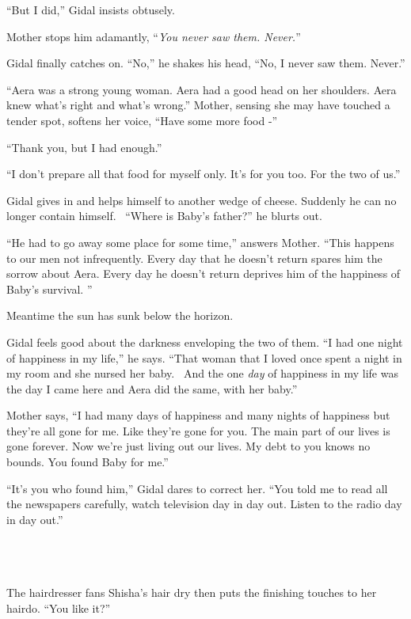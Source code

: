 \documentclass[twoside,11pt]{book}
\begin{document}
``But I did,'' Gidal insists obtusely.

Mother stops him adamantly, ``\textit{You never saw them. Never.}''

Gidal finally catches on. ``No,'' he shakes his head, ``No, I never saw them. Never.''

``Aera was a strong young woman. Aera had a good head on her shoulders. Aera knew what's right and what's
wrong.'' Mother, sensing she may have touched a tender spot, softens her voice, ``Have some
more food -''

``Thank you, but I had enough.''

``I don't prepare all that food for myself only. It's for you too. For the two of us.''

Gidal gives in and helps himself to another wedge of cheese. Suddenly he can no longer contain himself.
\ ``Where is Baby's father?'' he blurts out.

``He had to go away some place for some time,'' answers Mother. ``This happens to
our men not infrequently. Every day that he doesn't return spares him the sorrow about Aera. Every day he doesn't
return deprives him of the happiness of Baby's survival. ''

Meantime the sun has sunk below the horizon.

Gidal feels good about the darkness enveloping the two of them. ``I had one night of happiness in my
life,'' he says. ``That woman that I loved once spent a night in my room and she nursed her
baby. \ And the{ }one \textit{day }of happiness in my life was the day I came
here and Aera did the same, with her baby.''

Mother says, ``I had many days of happiness and many nights of happiness but they're all gone for me. Like
they're gone for you. The main part of our lives is gone forever. Now we're just living out our lives. My debt to you
knows no bounds. You found Baby for me.''

``It's you who found him,'' Gidal dares to correct her. ``You told me to read all
the newspapers carefully, watch television day in day out. Listen to the radio{ }day in day
out.''

~

\chapter{}

The hairdresser fans Shisha's hair dry then puts the finishing touches to her hairdo. ``You like it?''
\end{document}
